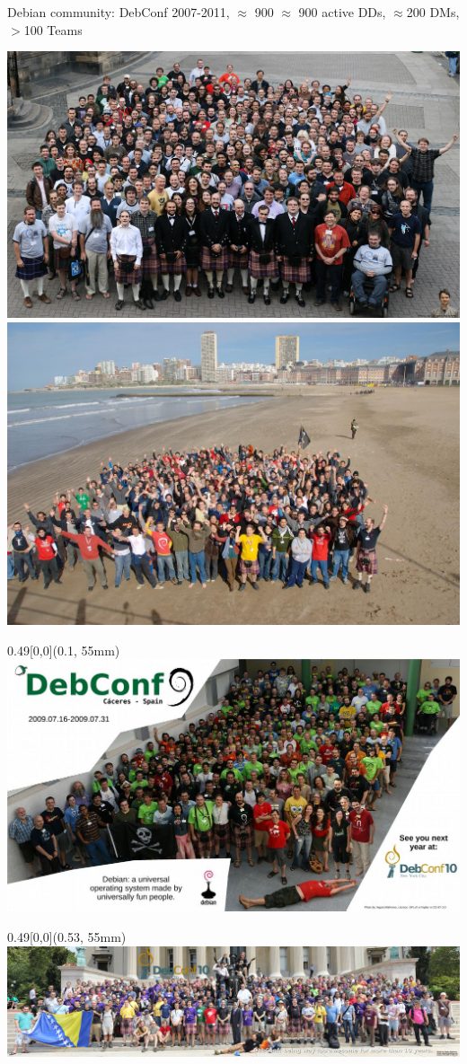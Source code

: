 \documentclass[]{beamer}
\begin{document}
\begin{frame}[t]{Debian community: DebConf 2007-2011, $\approx$ 900}
$\approx$ 900 active \alert{DDs}, $\approx$200 \alert{DMs}, $>$100 Teams
\vspace{-0.5em}
\begin{center}
\includegraphics[width=0.49\linewidth]{Dc07group_1024}
\includegraphics[width=0.49\linewidth]{Dc08group_1024}\\
\begin{textblock*}{0.49\linewidth}[0,0](0.1\linewidth, 55mm)%
\includegraphics[width=\linewidth]{Dc09group_1024}
\end{textblock*}
\begin{textblock*}{0.49\linewidth}[0,0](0.53\linewidth, 55mm)%
\includegraphics[width=\linewidth]{Dc10group_1024}\\

\end{textblock*}
\end{center}
\end{frame}
\end{document}
